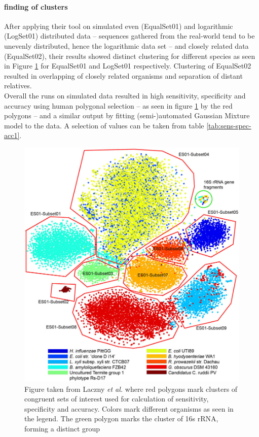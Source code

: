 \documentclass[twocolumn]{bmcart}%
\begin{document}
\paragraph*{finding of clusters}
After applying their tool on simulated even (EqualSet01) and logarithmic (LogSet01) distributed data -- sequences gathered from the real-world tend to be unevenly distributed, hence the logarithmic data set -- and closely related data (EqualSet02), their results showed distinct clustering for different species as seen in Figure \ref{img:clusterData1} for EqualSet01 and LogSet01 respectively. Clustering of EqualSet02 resulted in overlapping of closely related organisms and separation of distant relatives. \\
Overall the runs on simulated data resulted in high sensitivity, specificity and accuracy using human polygonal selection -- as seen in figure \ref{img:clusterData1} by the red polygons -- and a similar output by fitting (semi-)automated Gaussian Mixture model to the data. A selection of values can be taken from table \ref{tab:sens-spec-acc1}.
\begin{figure}
	\centering
	\includegraphics[width=.98\linewidth]{bilder/clusterData1.jpg}
	\caption{Figure taken from Laczny \textit{et al.} \cite{Laczny2014} where red polygons mark clusters of congruent sets of interest used for calculation of sensitivity, specificity and accuracy. Colors mark different organisms as seen in the legend. The green polygon marks the cluster of 16s rRNA, forming a distinct group}
	\label{img:clusterData1}
\end{figure}
\end{document}
